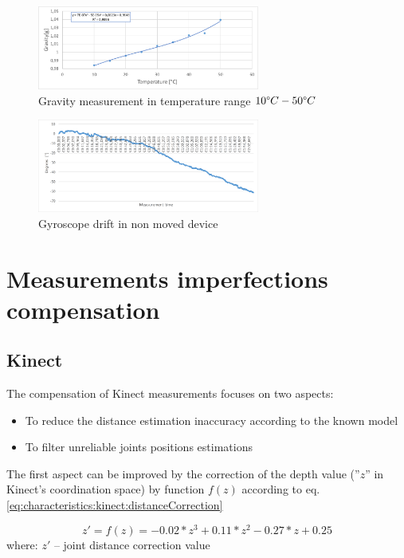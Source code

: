 \documentclass{llncs}
\begin{document}
\begin{figure}
	\centering 
	\includegraphics[width=0.65\textwidth]{Images/Fig02.eps}
	\caption{Gravity measurement in temperature range $10\degree C - 50\degree C$}
	\label{fig:characteristics:imu:imuTemp}
\end{figure}

\begin{figure}
	\centering 
	\includegraphics[width=0.65\textwidth]{Images/gyroDrift}
	\caption{Gyroscope drift in non moved device}
	\label{fig:characteristics:imu:gyroDrift}
\end{figure}

\section{Measurements imperfections compensation}
\subsection{Kinect}
The compensation of Kinect measurements focuses on two aspects:
\begin{itemize}
	\item To reduce the distance estimation inaccuracy according to the known model
	\item To filter unreliable joints positions estimations
\end{itemize}

The first aspect can be improved by the correction of the depth value (''$z$'' in Kinect's coordination space) by function $f(z)$ according to eq. \eqref{eq:characteristics:kinect:distanceCorrection} 

\begin{equation}
	z' = f(z) = -0.02*z^3 + 0.11*z^2 - 0.27*z + 0.25
	\label{eq:characteristics:kinect:distanceCorrection}
\end{equation}
where: $z'$ -- joint distance correction value
\end{document}

